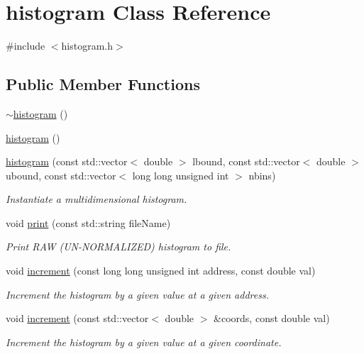 \hypertarget{classhistogram}{\section{histogram Class Reference}
\label{classhistogram}
}


{\ttfamily \#include $<$histogram.\-h$>$}

\subsection*{Public Member Functions}
\begin{DoxyCompactItemize}
\item 
\hyperlink{classhistogram_a68bd76ab77437beeb77342469fb77a67}{$\sim$histogram} ()
\item 
\hyperlink{classhistogram_acc41cd1e3ace837a977caeeb00f6606e}{histogram} ()
\item 
\hyperlink{classhistogram_a5a9a8918737bbb82ad73e31ac2d98a8b}{histogram} (const std\-::vector$<$ double $>$ lbound, const std\-::vector$<$ double $>$ ubound, const std\-::vector$<$ long long unsigned int $>$ nbins)
\begin{DoxyCompactList}\small\item\em Instantiate a multidimensional histogram. \end{DoxyCompactList}\item 
void \hyperlink{classhistogram_a801d984fe018521444ee0bd0776ba8dc}{print} (const std\-::string file\-Name)
\begin{DoxyCompactList}\small\item\em Print R\-A\-W (U\-N-\/\-N\-O\-R\-M\-A\-L\-I\-Z\-E\-D) histogram to file. \end{DoxyCompactList}\item 
void \hyperlink{classhistogram_a665e7f6c052d4b306c6fe7d0c600f1c8}{increment} (const long long unsigned int address, const double val)
\begin{DoxyCompactList}\small\item\em Increment the histogram by a given value at a given address. \end{DoxyCompactList}\item 
void \hyperlink{classhistogram_a1deef1080cd972343d7d5d8e5ef3a9f5}{increment} (const std\-::vector$<$ double $>$ \&coords, const double val)
\begin{DoxyCompactList}\small\item\em Increment the histogram by a given value at a given coordinate. \end{DoxyCompactList}\item 

\end{DoxyCompactItemize}
